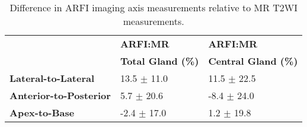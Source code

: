 \begin{table}[h!]
\centering
\caption{Difference in ARFI imaging axis measurements relative to MR T2WI measurements.}
\begin{tabular}{|l|l|l|} \hline
 & {\bf ARFI:MR} & {\bf ARFI:MR} \\
 & {\bf Total Gland (\%)} & {\bf Central Gland (\%)} \\ \hline
{\bf Lateral-to-Lateral} & 13.5 $\pm$ 11.0 & 11.5 $\pm$ 22.5 \\
{\bf Anterior-to-Posterior} & 5.7 $\pm$ 20.6 & -8.4 $\pm$ 24.0 \\
{\bf Apex-to-Base} & -2.4 $\pm$ 17.0 & 1.2 $\pm$ 19.8 \\
\hline
\end{tabular}
\label{tab:mr_arfi_axes_error}
\end{table}
